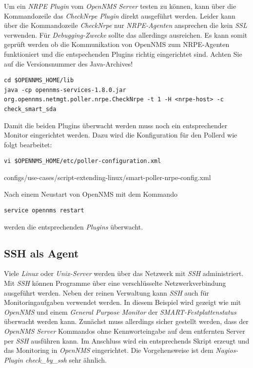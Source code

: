 Um ein \emph{NRPE Plugin} vom \emph{OpenNMS Server} testen zu können, kann über die Kommandozeile das \emph{CheckNrpe Plugin} direkt ausgeführt werden. Leider kann über die Kommandozeile \emph{CheckNrpe} nur \emph{NRPE-Agenten} ansprechen die kein \emph{SSL} verwenden. Für \emph{Debugging-Zwecke} sollte das allerdings ausreichen. Es kann somit geprüft werden ob die Kommunikation von OpenNMS zum NRPE-Agenten funktioniert und die entspechenden Plugins richtig eingerichtet sind. Achten Sie auf die Versionsnummer des Java-Archives!

\begin{lstlisting}[numbers=none]
cd $OPENNMS_HOME/lib
java -cp opennms-services-1.8.0.jar org.opennms.netmgt.poller.nrpe.CheckNrpe -t 1 -H <nrpe-host> -c check_smart_sda
\end{lstlisting}

Damit die beiden Plugins überwacht werden muss noch ein entsprechender Monitor eingerichtet werden. Dazu wird die Konfiguration für den Pollerd wie folgt bearbeitet:

\begin{lstlisting}[numbers=none]
vi $OPENNMS_HOME/etc/poller-configuration.xml
\end{lstlisting}


  {configs/use-cases/script-extending-linux/smart-poller-nrpe-config.xml}

Nach einem Neustart von OpenNMS mit dem Kommando

\begin{lstlisting}[numbers=none]
service opennms restart
\end{lstlisting}

werden die entsprechenden \emph{Plugins} überwacht.

\subsection{SSH als Agent}
Viele \emph{Linux} oder \emph{Unix-Server} werden über das Netzwerk mit  \emph{SSH} administriert. Mit \emph{SSH} können Programme über eine verschlüsselte Netzwerkverbindung ausgeführt werden. Neben der reinen Verwaltung kann \emph{SSH} auch für Monitoringaufgaben verwendet werden. In diesem Beispiel wird gezeigt wie mit \emph{OpenNMS} und einem \emph{General Purpose Monitor} der \emph{SMART-Festplattenstatus} überwacht werden kann. Zunächst muss allerdings sicher gestellt werden, dass der \emph{OpenNMS Server} Kommandos ohne Kennworteingabe auf dem entfernten Server per \emph{SSH} ausführen kann. Im Anschluss wird ein entsprechends Skript erzeugt und das Monitoring in \emph{OpenNMS} eingerichtet. Die Vorgehensweise ist dem \emph{Nagios-Plugin} \emph{check\_by\_ssh} sehr ähnlich.

